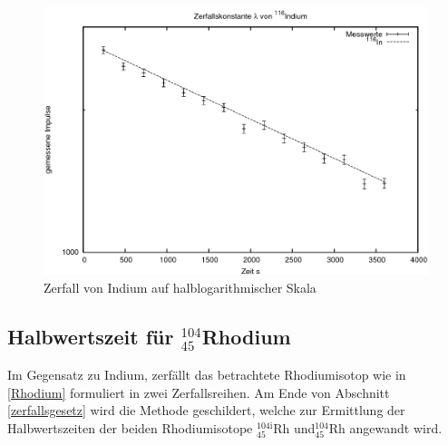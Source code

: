 \begin{figure}[h]
	\includegraphics[width=1\textwidth]{pics/indium.png}
	\caption{Zerfall von Indium auf halblogarithmischer Skala}
\end{figure}

\subsection{Halbwertszeit für $^{104}_{45}$Rhodium}
Im Gegensatz zu Indium, zerfällt das betrachtete Rhodiumisotop wie in \eqref{Rhodium} formuliert in zwei Zerfallsreihen.
Am Ende von Abschnitt \ref{zerfallsgesetz} wird die Methode geschildert, welche zur Ermittlung der Halbwertszeiten der beiden
Rhodiumisotope $^{104\text{i}}_{45}$Rh und$^{104}_{45}$Rh angewandt wird.

